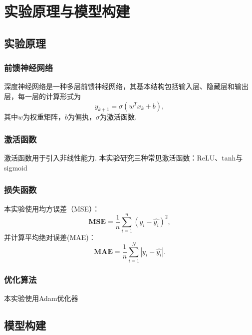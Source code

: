 

\chapter{实验原理与模型构建}
\label{cha:command}

\section{实验原理}
\subsection{前馈神经网络}
深度神经网络是一种多层前馈神经网络，其基本结构包括输入层、隐藏层和输出层，每一层的计算形式为
\begin{equation*}
    y_{k+1}=\sigma(w^T x_k+b),
\end{equation*}
其中$w$为权重矩阵，$b$为偏执，$\sigma$为激活函数.

\subsection{激活函数}
激活函数用于引入非线性能力. 本实验研究三种常见激活函数：ReLU、tanh与sigmoid

\subsection{损失函数}
本实验使用均方误差（MSE）：
\begin{equation*}
    \mathbf{MSE} = \frac{1}{n}\sum_{i=1}^n(y_i-\hat{y_i})^2,
\end{equation*}
并计算平均绝对误差(MAE)：
\begin{equation*}
    \mathbf{MAE} = \frac{1}{n}\sum_{i=1}^N\left | y_i-\hat{y_i}\right |.
\end{equation*}

\subsection{优化算法}
本实验使用Adam优化器



\section{模型构建}
